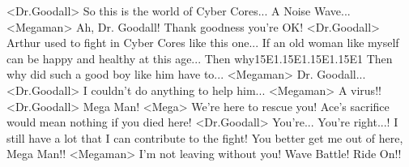 <Dr.Goodall> So this is the world of Cyber Cores... A Noise Wave... 
<Megaman> Ah, Dr. Goodall! Thank goodness you're OK! 
<Dr.Goodall> Arthur used to fight in Cyber Cores like this one... 
If an old woman like myself can be happy and healthy at this age... 
Then why{15}{E1}.{15}{E1}.{15}{E1}.{15}{E1} 
Then why did such a good boy like him have to... 
<Megaman> Dr. Goodall... 
<Dr.Goodall> I couldn't do anything to help him... 
<Megaman> A virus!! 
<Dr.Goodall> Mega Man! 
<Mega> We're here to rescue you! 
Ace's sacrifice would mean nothing if you died here! 
<Dr.Goodall> You're... 
You're right...! 
I still have a lot that I can contribute to the fight! 
You better get me out of here, Mega Man!! 
<Megaman> I'm not leaving without you! 
Wave Battle! Ride On!! 
